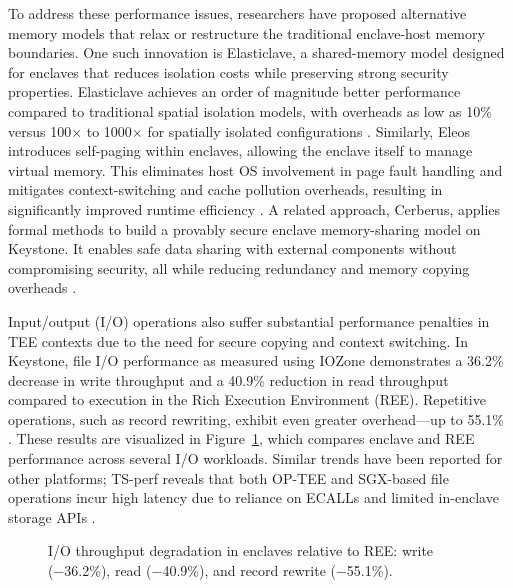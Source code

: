 To address these performance issues, researchers have proposed alternative memory models that relax or restructure the traditional enclave-host memory boundaries. One such innovation is Elasticlave, a shared-memory model designed for enclaves that reduces isolation costs while preserving strong security properties. Elasticlave achieves an order of magnitude better performance compared to traditional spatial isolation models, with overheads as low as 10\% versus 100× to 1000× for spatially isolated configurations \cite{yu2022elasticlave}. Similarly, Eleos introduces self-paging within enclaves, allowing the enclave itself to manage virtual memory. This eliminates host OS involvement in page fault handling and mitigates context-switching and cache pollution overheads, resulting in significantly improved runtime efficiency \cite{orenbach2023eleos}. A related approach, Cerberus, applies formal methods to build a provably secure enclave memory-sharing model on Keystone. It enables safe data sharing with external components without compromising security, all while reducing redundancy and memory copying overheads \cite{lee2022cerberus}.

Input/output (I/O) operations also suffer substantial performance penalties in TEE contexts due to the need for secure copying and context switching. In Keystone, file I/O performance as measured using IOZone demonstrates a 36.2\% decrease in write throughput and a 40.9\% reduction in read throughput compared to execution in the Rich Execution Environment (REE). Repetitive operations, such as record rewriting, exhibit even greater overhead—up to 55.1\% \cite{Lee2019}. These results are visualized in Figure~\ref{fig:io-throughput}, which compares enclave and REE performance across several I/O workloads. Similar trends have been reported for other platforms; TS-perf reveals that both OP-TEE and SGX-based file operations incur high latency due to reliance on ECALLs and limited in-enclave storage APIs \cite{suzaki2021tsperf}.

\begin{figure}[htbp]
\centering
{}
\caption{I/O throughput degradation in enclaves relative to REE: write (−36.2\%), read (−40.9\%), and record rewrite (−55.1\%).}
\label{fig:io-throughput}
\end{figure}

